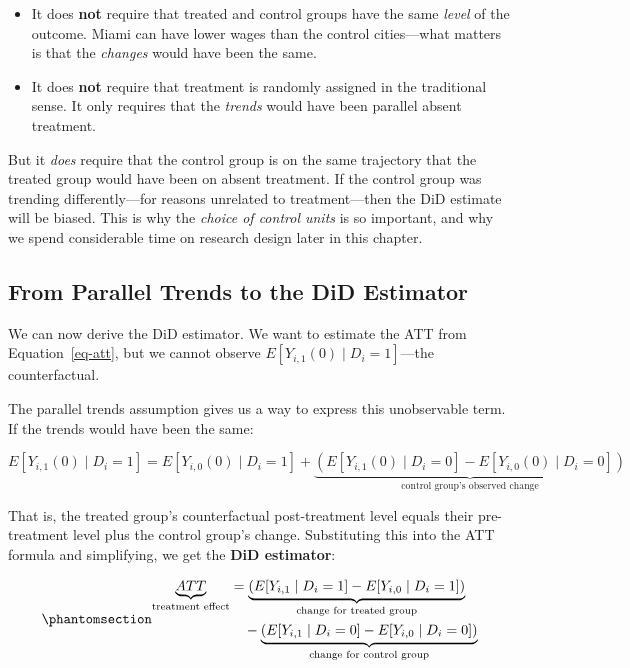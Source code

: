 \documentclass[
  letterpaper,
  DIV=11,
  numbers=noendperiod]{scrreprt}
\providecommand{\tightlist}{%
  \setlength{\itemsep}{0pt}\setlength{\parskip}{0pt}}
\begin{document}
\begin{itemize}
\tightlist
\item
  It does \textbf{not} require that treated and control groups have the
  same \emph{level} of the outcome. Miami can have lower wages than the
  control cities---what matters is that the \emph{changes} would have
  been the same.
\item
  It does \textbf{not} require that treatment is randomly assigned in
  the traditional sense. It only requires that the \emph{trends} would
  have been parallel absent treatment.
\end{itemize}

But it \emph{does} require that the control group is on the same
trajectory that the treated group would have been on absent treatment.
If the control group was trending differently---for reasons unrelated to
treatment---then the DiD estimate will be biased. This is why the
\emph{choice of control units} is so important, and why we spend
considerable time on research design later in this chapter.

\subsection{From Parallel Trends to the DiD
Estimator}\label{from-parallel-trends-to-the-did-estimator}

We can now derive the DiD estimator. We want to estimate the ATT from
Equation~\ref{eq-att}, but we cannot observe
\(E[Y_{i,1}(0) \mid D_i = 1]\)---the counterfactual.

The parallel trends assumption gives us a way to express this
unobservable term. If the trends would have been the same:

\[
E[Y_{i,1}(0) \mid D_i = 1] = E[Y_{i,0}(0) \mid D_i = 1] + \underbrace{(E[Y_{i,1}(0) \mid D_i = 0] - E[Y_{i,0}(0) \mid D_i = 0])}_{\text{control group's observed change}}
\]

That is, the treated group's counterfactual post-treatment level equals
their pre-treatment level plus the control group's change. Substituting
this into the ATT formula and simplifying, we get the \textbf{DiD
estimator}:

\begin{equation}\protect\phantomsection\label{eq-did-estimator}{
\begin{aligned}
\underbrace{ATT}_{\text{treatment effect}} &= \underbrace{\left(E[Y_{i,1} \mid D_i = 1] - E[Y_{i,0} \mid D_i = 1]\right)}_{\text{change for treated group}} \\
&\quad - \underbrace{\left(E[Y_{i,1} \mid D_i = 0] - E[Y_{i,0} \mid D_i = 0]\right)}_{\text{change for control group}}
\end{aligned}
}\end{equation}
\end{document}
